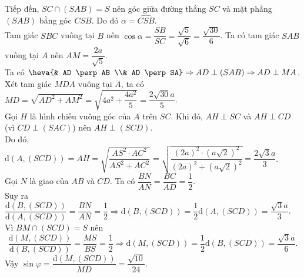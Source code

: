 \begin{ex}
{\begin{itemchoice}
			Tiếp đến, $SC\cap (SAB)=S$ nên góc giữa  đường thẳng $SC$ và mặt phẳng $(SAB)$ bằng góc $\widehat{CSB}$. Do đó $\alpha=\widehat{CSB}$.\\
			 Tam giác $SBC$ vuông tại $B$ nên $\cos \alpha = \dfrac{SB}{SC} = \dfrac{\sqrt{5}}{\sqrt{6}} = \dfrac{\sqrt{30}}{6}$.
			\itemch Ta có tam giác  $SAB$ vuông tại $A$ nên $AM=\dfrac{2a}{\sqrt{5}}$.\\
			Ta có $\heva{& AD \perp AB \\& AD \perp SA} \Rightarrow AD \perp (SAB) \Rightarrow AD \perp  MA$.\\
			 Xét tam giác $MDA$ vuông tại $A$, ta có $MD=\sqrt{AD^{2}+AM^{2}}=\sqrt{4a^{2}+\dfrac{4a^{2}}{5}}=\dfrac{2\sqrt{30}a}{5}$.\\
			Gọi $H$ là hình chiếu vuông góc của $A$ trên $SC$. Khi đó, $AH\perp SC$ và $AH\perp CD$  (vì $CD\perp (SAC)$) nên $AH\perp (SCD)$.\\
			Do đó, $\mathrm{d}\left(A,(SCD)\right)=AH=\sqrt{\dfrac{AS^2\cdot  AC^2}{AS^2+AC^2}}=\sqrt{\dfrac{(2a)^2\cdot\left(a\sqrt{2}\right)^2}{(2a)^2+\left(a\sqrt{2}\right)^2}}=\dfrac{2\sqrt{3}a}{3}$.\\
			Gọi $N$ là giao của $AB$ và $CD$. Ta  có $\dfrac{BN}{AN}=\dfrac{BC}{AD}=\dfrac{1}{2}$.\\
			 Suy ra $\dfrac{\mathrm{d}\left(B,(SCD)\right)}{\mathrm{d}\left(A,(SCD)\right)}=\dfrac{BN}{AN}=\dfrac{1}{2}\Rightarrow\mathrm{d}\left(B,(SCD)\right)=\dfrac{1}{2}\mathrm{d}\left(A,(SCD)\right)=\dfrac{\sqrt{3}a}{3}$.\\
			 Vì $BM\cap (SCD)=S$ nên $$\dfrac{\mathrm{d}\left(M,(SCD)\right)}{\mathrm{d}\left(B,(SCD)\right)}=\dfrac{MS}{BS}=\dfrac{1}{2}\Rightarrow\mathrm{d}\left(M,(SCD)\right)=\dfrac{1}{2}\mathrm{d}\left(B,(SCD)\right)=\dfrac{\sqrt{3}a}{6}.$$
			 Vậy $\sin \varphi = \dfrac{\mathrm{d}\left(M,(SCD)\right)}{MD} = \dfrac{\sqrt{10}}{24}$.
		\end{itemchoice}
	 }
\end{ex}




